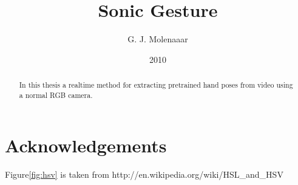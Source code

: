 \documentclass[a4paper]{report}
\begin{document}
\title{Sonic Gesture}
\author{G. J. Molenaaar}
\date{2010}

\maketitle{}

\newpage{}
\newpage{}

\tableofcontents{}
\listoffigures{}
\listoftables{}

\chapter*{Acknowledgements}
Figure\ref{fig:hsv} is taken from http://en.wikipedia.org/wiki/HSL\_and\_HSV

\begin{abstract}
In this thesis a real\-time method for extracting pre\-trained hand poses from
video using a normal RGB camera.
\end{abstract}










%
%
%





\end{document}
